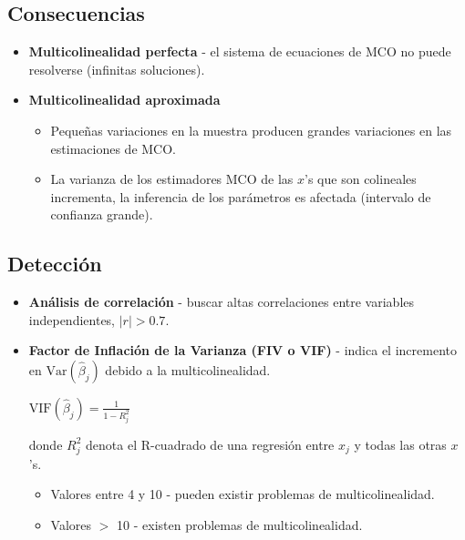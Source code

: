 \documentclass[10pt, a4paper, landscape]{article}
\newcommand{\Var}{\mathrm{Var}}
\begin{document}
\begin{multicols}{3}
		\subsection*{Consecuencias}
		
		\begin{itemize}[leftmargin=*]
			\item \textbf{Multicolinealidad perfecta} - el sistema de ecuaciones de MCO no puede resolverse (infinitas soluciones).
			\item \textbf{Multicolinealidad aproximada}
			
			\begin{itemize}[leftmargin=*]
				\item Pequeñas variaciones en la muestra producen grandes variaciones en las estimaciones de MCO.
				\item La varianza de los estimadores MCO de las $x$'s que son colineales incrementa, la inferencia de los parámetros es afectada (intervalo de confianza grande).
			\end{itemize}
		\end{itemize}
		
		\subsection*{Detección}
		
		\begin{itemize}[leftmargin=*]
			\item \textbf{Análisis de correlación} - buscar altas correlaciones entre variables independientes, $\lvert r \rvert > 0.7$.
			\item \textbf{Factor de Inflación de la Varianza (FIV o VIF)} - indica el incremento en $\Var(\hat{\beta}_{j})$ debido a la multicolinealidad.
			
			\begin{center}
				$\mathrm{VIF}(\hat{\beta}_{j}) = \frac{1}{1 - R_{j}^{2}}$
			\end{center}
			
			donde $R^{2}_{j}$ denota el R-cuadrado de una regresión entre $x_{j}$ y todas las otras $x$'s.
			
			\begin{itemize}[leftmargin=*]
				\item Valores entre 4 y 10 - pueden existir problemas de multicolinealidad.
				\item Valores $>$ 10 - existen problemas de multicolinealidad.
			\end{itemize}
		\end{itemize}
		

\end{multicols}
\end{document}
